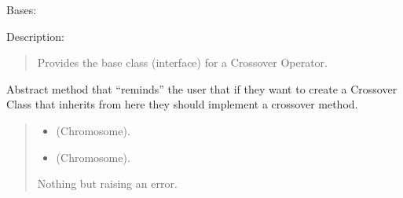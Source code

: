 \documentclass[letterpaper,10pt,english]{sphinxmanual}
\begin{document}
\begin{fulllineitems}
\label{\detokenize{pygenalgo.operators.crossover:pygenalgo.operators.crossover.crossover_operator.CrossoverOperator}}
\pysigstartsignatures
\pysiglinewithargsret
{}
{}
{}
\pysigstopsignatures
\sphinxAtStartPar
Bases: {\hyperref[\detokenize{pygenalgo.operators:pygenalgo.operators.genetic_operator.GeneticOperator}]{}}

\sphinxAtStartPar
Description:
\begin{quote}

\sphinxAtStartPar
Provides the base class (interface) for a Crossover Operator.
\end{quote}

\begin{fulllineitems}
\label{\detokenize{pygenalgo.operators.crossover:pygenalgo.operators.crossover.crossover_operator.CrossoverOperator.crossover}}
\pysigstartsignatures
\pysiglinewithargsret
{}
{\sphinxparamcomma {}}
{}
\pysigstopsignatures
\sphinxAtStartPar
Abstract method that “reminds” the user that if they want to
create a Crossover Class that inherits from here they should
implement a crossover method.
\begin{quote}\begin{description}
\begin{itemize}
\item {} 
\sphinxAtStartPar
{} \textendash{} (Chromosome).

\item {} 
\sphinxAtStartPar
{} \textendash{} (Chromosome).

\end{itemize}

\sphinxAtStartPar
Nothing but raising an error.

\end{description}\end{quote}

\end{fulllineitems}


\end{fulllineitems}
\end{document}

